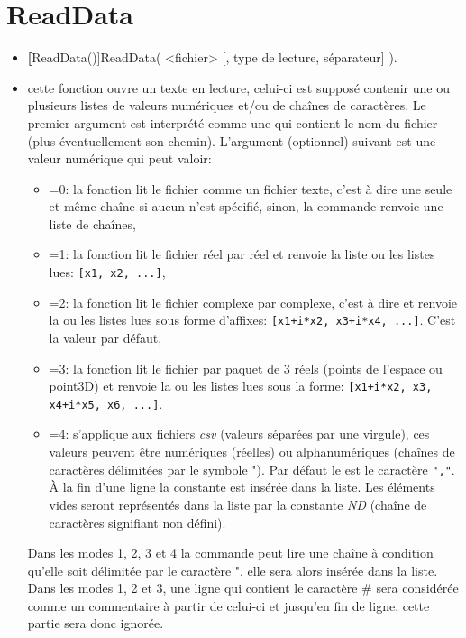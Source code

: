 \section{ReadData}\label{cmdReadData}

\begin{itemize}
 \item \util \textbf[ReadData()]{ReadData( <fichier> [, type de lecture, séparateur] )}.
 \item \desc cette fonction ouvre un  texte en lecture, celui-ci est supposé contenir une ou plusieurs listes de valeurs numériques et/ou de chaînes de caractères. Le premier argument est interprété comme une  qui contient le nom du fichier (plus éventuellement son chemin). L'argument (optionnel) suivant  est une valeur numérique qui peut valoir:
\begin{itemize}
 \item {}=0: la fonction lit le fichier comme un fichier texte, c'est à dire une seule et même chaîne si aucun  n'est spécifié, sinon, la commande renvoie une liste de chaînes,
 \item {}=1: la fonction lit le fichier réel par réel et renvoie la liste ou les listes lues: \verb|[x1, x2, ...]|,
 \item {}=2: la fonction lit le fichier complexe par complexe, c'est à dire  et renvoie la ou les listes lues sous forme d'affixes: \verb|[x1+i*x2, x3+i*x4, ...]|. C'est la valeur par défaut,
 \item {}=3: la fonction lit le fichier par paquet de 3 réels (points de l'espace ou point3D) et renvoie la ou les listes lues sous la forme: \verb|[x1+i*x2, x3, x4+i*x5, x6, ...]|.
 \item {}=4: s'applique aux fichiers \emph{csv} (valeurs séparées par une virgule), ces valeurs peuvent être numériques (réelles) ou alphanumériques (chaînes de caractères délimitées par le symbole "). Par défaut le  est le caractère \verb|","|. \`A la fin d'une ligne la constante \jump est insérée dans la liste. Les éléments vides seront représentés dans la liste par la constante \textit{ND} (chaîne de caractères signifiant \og non défini\fg).
\end{itemize}

 Dans les modes 1, 2, 3 et 4 la commande peut lire une chaîne à condition qu'elle soit délimitée par le caractère ", elle sera alors insérée dans la liste. Dans les modes 1, 2 et 3, une ligne qui contient le caractère \# sera considérée comme un commentaire à partir de celui-ci et jusqu'en fin de ligne, cette partie sera donc ignorée.


\end{itemize}
